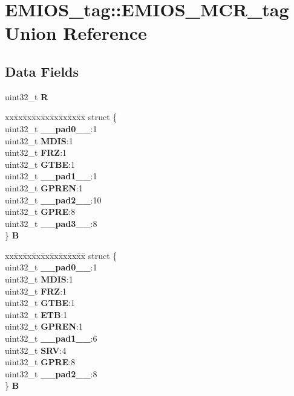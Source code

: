 \hypertarget{unionEMIOS__tag_1_1EMIOS__MCR__tag}{}\section{E\+M\+I\+O\+S\+\_\+tag\+::E\+M\+I\+O\+S\+\_\+\+M\+C\+R\+\_\+tag Union Reference}
\label{unionEMIOS__tag_1_1EMIOS__MCR__tag}
\subsection*{Data Fields}
\begin{DoxyCompactItemize}
\item 
\mbox{\label{unionEMIOS__tag_1_1EMIOS__MCR__tag_ade537c636bf3ea70fcc1e4ba2116d74b}} 
uint32\+\_\+t {\bfseries R}
\item 
\mbox{\label{unionEMIOS__tag_1_1EMIOS__MCR__tag_a211a7bc96c8f7e6db97ac56de775d46b}} 
\begin{tabbing}
xx\=xx\=xx\=xx\=xx\=xx\=xx\=xx\=xx\=\kill
struct \{\\
\>uint32\_t {\bfseries \_\_pad0\_\_}:1\\
\>uint32\_t {\bfseries MDIS}:1\\
\>uint32\_t {\bfseries FRZ}:1\\
\>uint32\_t {\bfseries GTBE}:1\\
\>uint32\_t {\bfseries \_\_pad1\_\_}:1\\
\>uint32\_t {\bfseries GPREN}:1\\
\>uint32\_t {\bfseries \_\_pad2\_\_}:10\\
\>uint32\_t {\bfseries GPRE}:8\\
\>uint32\_t {\bfseries \_\_pad3\_\_}:8\\
\} {\bfseries B}\\

\end{tabbing}\item 
\mbox{\label{unionEMIOS__tag_1_1EMIOS__MCR__tag_abe86721d610c8b573844bfce9b69fa5a}} 
\begin{tabbing}
xx\=xx\=xx\=xx\=xx\=xx\=xx\=xx\=xx\=\kill
struct \{\\
\>uint32\_t {\bfseries \_\_pad0\_\_}:1\\
\>uint32\_t {\bfseries MDIS}:1\\
\>uint32\_t {\bfseries FRZ}:1\\
\>uint32\_t {\bfseries GTBE}:1\\
\>uint32\_t {\bfseries ETB}:1\\
\>uint32\_t {\bfseries GPREN}:1\\
\>uint32\_t {\bfseries \_\_pad1\_\_}:6\\
\>uint32\_t {\bfseries SRV}:4\\
\>uint32\_t {\bfseries GPRE}:8\\
\>uint32\_t {\bfseries \_\_pad2\_\_}:8\\
\} {\bfseries B}\\


\end{tabbing}
\end{DoxyCompactItemize}
